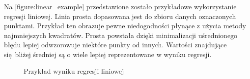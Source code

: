 \documentclass[10pt,a4paper]{article}
\begin{document}
Na \autoref{figure:linear_example} przedstawione zostało przykładowe wykorzystanie regresji liniowej. Linia prosta dopasowana jest do zbioru danych oznaczonych punktami. Przykład ten obrazuje pewne niedogodności płynące z użycia metody najmniejszych kwadratów. Prosta powstała dzięki minimalizacji uśrednionego błędu lepiej odwzorowuje niektóre punkty od innych. Wartości znajdujące się bliżej średniej są o wiele lepiej reprezentowane w wyniku regresji. 
\begin{figure}[!ht]
	\centering
	\caption{Przykład wyniku regresji liniowej}
	\label{figure:linear_example}
\end{figure}
\FloatBarrier
\end{document}
